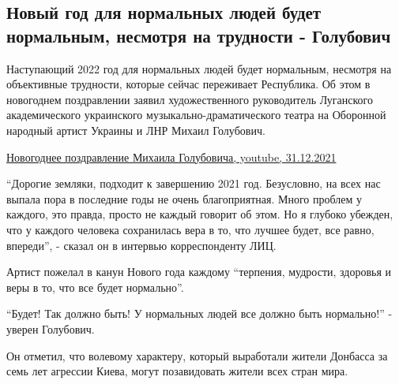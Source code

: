  
 
 
 
 
\subsection{Новый год для нормальных людей будет нормальным, несмотря на трудности - Голубович}
\label{sec:31_12_2021.stz.news.lnr.lug_info.1.golubovich_new_year}


Наступающий 2022 год для нормальных людей будет нормальным, несмотря на
объективные трудности, которые сейчас переживает Республика. Об этом в
новогоднем поздравлении заявил художественного руководитель Луганского
академического украинского музыкально-драматического театра на Оборонной
народный артист Украины и ЛНР Михаил Голубович.

\href{https://www.youtube.com/watch?v=WlPzOZ49Peo}{%
Новогоднее поздравление Михаила Голубовича, youtube, 31.12.2021%
}


\enquote{Дорогие земляки, подходит к завершению 2021 год. Безусловно, на всех нас
выпала пора в последние годы не очень благоприятная. Много проблем у каждого,
это правда, просто не каждый говорит об этом. Но я глубоко убежден, что у
каждого человека сохранилась вера в то, что лучшее будет, все равно, впереди},
- сказал он в интервью корреспонденту ЛИЦ.

Артист пожелал в канун Нового года каждому \enquote{терпения, мудрости, здоровья и веры
в то, что все будет нормально}.

\enquote{Будет! Так должно быть! У нормальных людей все должно быть нормально!} -
уверен Голубович.

Он отметил, что волевому характеру, который выработали жители Донбасса за семь
лет агрессии Киева, могут позавидовать жители всех стран мира.

